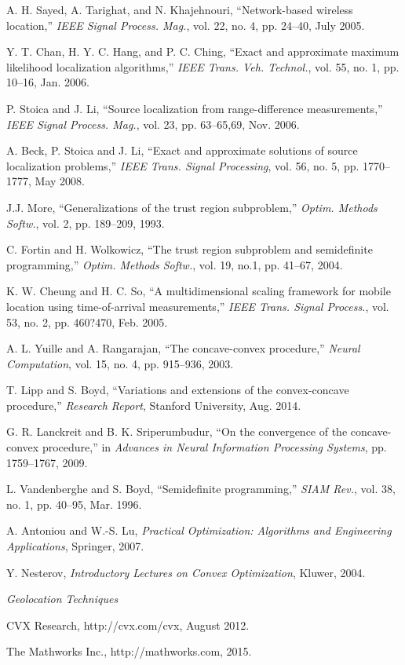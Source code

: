 \begin{thebibliography}{99}
A. H. Sayed, A. Tarighat, and N. Khajehnouri, ``Network-based wireless location,'' {\em IEEE Signal Process. Mag.}, vol. 22, no. 4, pp. 24--40, July 2005.

 Y. T. Chan, H. Y. C. Hang, and P. C. Ching, ``Exact and approximate maximum likelihood localization algorithms,'' {\em IEEE Trans. Veh. Technol.}, vol. 55, no. 1, pp. 10--16, Jan. 2006.

P. Stoica and J. Li, ``Source localization from range-difference measurements,'' {\em IEEE Signal Process. Mag.}, vol. 23, pp. 63--65,69, Nov.
2006.

A. Beck, P. Stoica and J. Li,  ``Exact and approximate solutions of source localization problems,'' {\em IEEE Trans. Signal Processing}, vol. 56, no. 5, pp. 1770--1777, May
2008.

J.J. More, ``Generalizations of the trust region subproblem,'' {\em Optim. Methods Softw.}, vol. 2, pp. 189--209, 1993.

C. Fortin and H. Wolkowicz, ``The trust region subproblem and semidefinite programming,'' {\em Optim. Methods Softw.}, vol. 19, no.1, pp. 41--67, 2004.

K. W. Cheung and H. C. So, ``A multidimensional scaling framework for mobile location using time-of-arrival measurements,'' {\em IEEE Trans. Signal Process.}, vol. 53, no. 2, pp. 460?470, Feb. 2005.

A. L. Yuille and A. Rangarajan, ``The concave-convex procedure,'' {\em Neural Computation}, vol. 15, no. 4, pp. 915--936, 2003.

T. Lipp and S. Boyd, ``Variations and extensions of the convex-concave procedure,'' {\em Research Report}, Stanford University, Aug. 2014.

G. R. Lanckreit and B. K. Sriperumbudur, ``On the convergence of the concave-convex procedure,'' in  {\em Advances in Neural Information Processing Systems}, pp. 1759--1767, 2009.

L. Vandenberghe and S. Boyd, ``Semidefinite programming,'' {\em SIAM Rev.}, vol. 38, no. 1, pp. 40--95, Mar. 1996.

A. Antoniou and W.-S. Lu, {\em Practical Optimization: Algorithms and Engineering Applications}, Springer, 2007.

Y. Nesterov, {\em Introductory Lectures on Convex Optimization}, Kluwer, 2004.

{\em Geolocation Techniques}

CVX Research, http://cvx.com/cvx, August 2012.

The Mathworks Inc., http://mathworks.com, 2015.

\end{thebibliography}